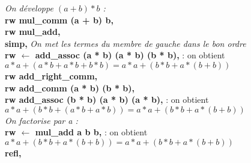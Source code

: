   \textit{On développe $(a + b) * b$ :} \\
 \textbf{ rw mul\_comm (a + b) b,} \\
  \textbf{rw mul\_add,} \\
 \textbf{simp,}  \textit{On met les termes du membre de gauche dans le bon ordre } \\
  \textbf{rw $\leftarrow$ add\_assoc (a * b) (a * b) (b * b),} : on obtient $a * a + (a * b + a * b + b * b) = a * a + (b * b + a * (b + b))$\\
  \textbf{rw add\_right\_comm,} \\
  \textbf{rw add\_comm (a * b) (b * b),} \\
  \textbf{rw add\_assoc (b * b) (a * b) (a * b),} : on obtient $a * a + (b * b + (a * b + a * b)) = a * a + (b * b + a * (b + b))$\\
  \textit{On factorise par a :}\\
  \textbf{rw $\leftarrow$ mul\_add a b b,} : on obtient $a * a + (b * b + a * (b + b)) = a * a + (b * b + a * (b + b))
$\\
  \textbf{refl,}
